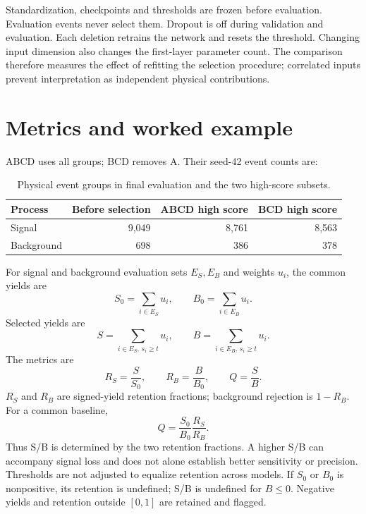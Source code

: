 \documentclass[11pt,a4paper]{article}
\begin{document}
Standardization, checkpoints and thresholds are frozen before evaluation. Evaluation events never select them.
Dropout is off during validation and evaluation. Each deletion retrains the network and resets the threshold.
Changing input dimension also changes the first-layer parameter count.
The comparison therefore measures the effect of refitting the selection procedure; correlated inputs prevent interpretation as independent physical contributions.

\section{Metrics and worked example}\label{sec:basic}
ABCD uses all groups; BCD removes A. Their seed-42 event counts are:
\begin{table}[H]
\caption{Physical event groups in final evaluation and the two high-score subsets.}
\label{tab:groups}
\centering
\begin{tabular}{lrrr}
\toprule
Process & Before selection & ABCD high score & BCD high score \\
\midrule
Signal & 9,049 & 8,761 & 8,563 \\
Background & 698 & 386 & 378 \\
\bottomrule
\end{tabular}
\end{table}

For signal and background evaluation sets $E_S,E_B$ and weights $u_i$, the common yields are
\[
 S_0=\sum_{i\in E_S}u_i,\qquad
 B_0=\sum_{i\in E_B}u_i.
\]
Selected yields are
\[
 S=\sum_{i\in E_S,\,s_i\geq t}u_i,\qquad
 B=\sum_{i\in E_B,\,s_i\geq t}u_i.
\]
The metrics are
\[
 R_S=\frac{S}{S_0},\qquad R_B=\frac{B}{B_0},\qquad Q=\frac{S}{B}.
\]
$R_S$ and $R_B$ are signed-yield retention fractions; background rejection is $1-R_B$.
For a common baseline,
\[
 Q=\frac{S_0}{B_0}\frac{R_S}{R_B}.
\]
Thus S/B is determined by the two retention fractions. A higher S/B can accompany signal loss and does not alone establish better sensitivity or precision.
Thresholds are not adjusted to equalize retention across models.
If $S_0$ or $B_0$ is nonpositive, its retention is undefined; S/B is undefined for $B\leq0$.
Negative yields and retention outside $[0,1]$ are retained and flagged.
\end{document}
